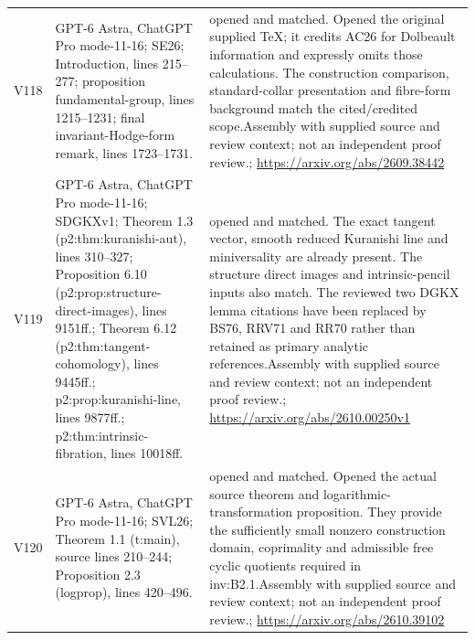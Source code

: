 \documentclass[11pt,a4paper]{article}
\theoremstyle{plain}
\theoremstyle{definition}
\begin{document}
\begin{longtable}{@{}L{.08\linewidth}L{.31\linewidth}L{.56\linewidth}@{}}
V118 & GPT-6 Astra, ChatGPT Pro mode-11-16; S\newline E26; Introduction, lines 215--277; proposition fundamental-group, lines 1215--1231; final invariant-Hodge-form remark, lines 1723--1731. & opened and matched. Opened the original supplied TeX; it credits AC26 for Dolbeault information and expressly omits those calculations. The construction comparison, standard-collar presentation and fibre-form background match the cited/\allowbreak{}credited scope.\newline Assembly with supplied source and review context; not an independent proof review.\newline {}; \url{https://arxiv.org/abs/2609.38442}\\
V119 & GPT-6 Astra, ChatGPT Pro mode-11-16; S\newline DGKXv1; Theorem 1.3 (p2:\allowbreak{}thm:\allowbreak{}kuranishi-aut), lines 310--327; Proposition 6.10 (p2:\allowbreak{}prop:\allowbreak{}structure-direct-images), lines 9151ff.; Theorem 6.12 (p2:\allowbreak{}thm:\allowbreak{}tangent-cohomology), lines 9445ff.; p2:\allowbreak{}prop:\allowbreak{}kuranishi-line, lines 9877ff.; p2:\allowbreak{}thm:\allowbreak{}intrinsic-fibration, lines 10018ff. & opened and matched. The exact tangent vector, smooth reduced Kuranishi line and miniversality are already present. The structure direct images and intrinsic-pencil inputs also match. The reviewed two DGKX lemma citations have been replaced by BS76, RRV71 and RR70 rather than retained as primary analytic references.\newline Assembly with supplied source and review context; not an independent proof review.\newline {}; \url{https://arxiv.org/abs/2610.00250v1}\\
V120 & GPT-6 Astra, ChatGPT Pro mode-11-16; S\newline VL26; Theorem 1.1 (t:\allowbreak{}main), source lines 210--244; Proposition 2.3 (logprop), lines 420--496. & opened and matched. Opened the actual source theorem and logarithmic-transformation proposition. They provide the sufficiently small nonzero construction domain, coprimality and admissible free cyclic quotients required in inv:\allowbreak{}B2.1.\newline Assembly with supplied source and review context; not an independent proof review.\newline {}; \url{https://arxiv.org/abs/2610.39102}\\

\end{longtable}
\end{document}
